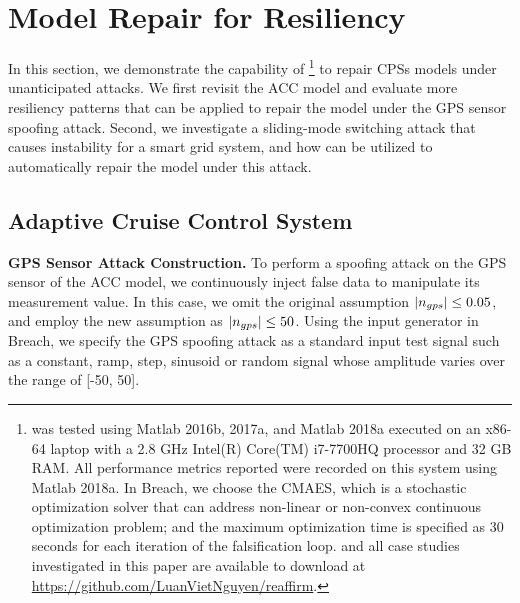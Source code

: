 \section{Model Repair for Resiliency}
%
%
In this section, we demonstrate the capability of \toolreaffirm\footnote{\toolreaffirm was tested using Matlab 2016b, 2017a, and Matlab 2018a executed on an x86-64 laptop with a 2.8 GHz Intel(R) Core(TM) i7-7700HQ processor and 32 GB RAM. All performance metrics reported were recorded on this system using Matlab 2018a. In Breach, we choose the CMAES, which is a stochastic optimization solver that can address non-linear or non-convex continuous optimization problem; and the maximum optimization time is specified as 30 seconds for each iteration of the falsification loop. \toolreaffirm and all case studies investigated in this paper are available to download at \url{https://github.com/LuanVietNguyen/reaffirm}.} to repair CPSs models under unanticipated attacks. We first revisit the ACC model and evaluate more resiliency patterns that can be applied to repair the model under the GPS sensor spoofing attack. Second, we investigate a sliding-mode switching attack that causes instability for a smart grid system, and how \toolreaffirm can be utilized to automatically repair the model under this attack.

\subsection{Adaptive Cruise Control System}
{\bf GPS Sensor Attack Construction.} To perform a spoofing attack on the GPS sensor of the ACC model, we continuously inject false data to manipulate its measurement value. In this case, we omit the original assumption $|n_{gps}| \leq 0.05$, and employ the new assumption as $|n_{gps}| \leq 50$. Using the input generator in Breach, we specify the GPS spoofing attack as a standard input test signal such as a constant, ramp, step, sinusoid or random signal whose amplitude varies over the range of [-50, 50]. 


